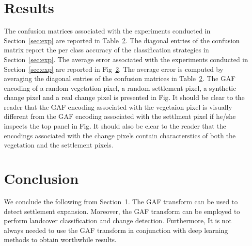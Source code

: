 \documentclass{article}
\begin{document}
\section{Results}
\label{sec:results}
The confusion matrices associated with the experiments conducted in Section~\ref{sec:exp} are reported in Table~\ref{}. The diagonal entries of the confusion matrix report the per class accuracy of the classification strategies in Section~\ref{sec:exp}. The average error associated with the experiments conducted in Section~\ref{sec:exp} are reported in Fig~\ref{}. The average error is computed by averaging the diagonal entries of the confusion matrices in Table~\ref{}. The GAF encoding of a random vegetation pixel, a random settlement pixel, a synthetic change pixel and a real change pixel is presented in Fig. It should be clear to the reader that the GAF encoding associated with the vegetaion pixel is visually different from the GAF encoding associated with the settlment pixel if he/she inspects the top panel in Fig. It should also be clear to the reader that the encodings associated with the change pixels contain characterstics of both the vegetation and the settlement pixels.   

\section{Conclusion}
We conclude the following from Section~\ref{sec:results}. The GAF transform can be used to detect settlement expansion. Moreover, the GAF transform can be employed to perform landcover classification and change detection. Furthermore, It is not always needed to use the GAF transform in conjunction with deep learning methods to obtain worthwhile results.  
\end{document}
